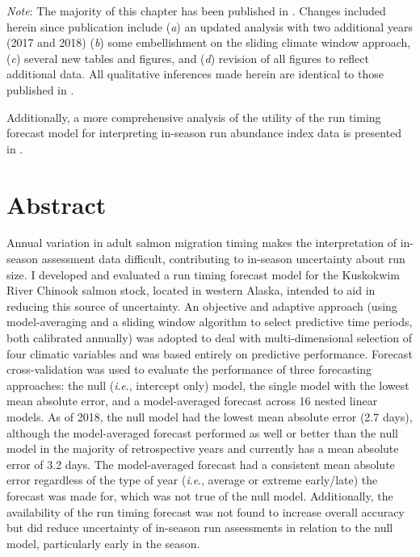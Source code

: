 \documentclass[12pt,]{book}
\theoremstyle{definition}
\theoremstyle{definition}
\theoremstyle{definition}
\theoremstyle{remark}
\begin{document}
\singlespacing
\noindent
\footnotesize
\textit{Note}: The majority of this chapter has been published in
\cite{staton-etal-2017-rtf}. Changes included herein since publication
include (\textit{a}) an updated analysis with two additional years (2017
and 2018) (\textit{b}) some embellishment on the sliding climate window
approach, (\textit{c}) several new tables and figures, and (\textit{d})
revision of all figures to reflect additional data. All qualitative
inferences made herein are identical to those published in
\cite{staton-etal-2017-rtf}.

\vspace{0.25cm}

\noindent
Additionally, a more comprehensive analysis of the utility of the run
timing forecast model for interpreting in-season run abundance index
data is presented in \citet{staton-catalano-2019}. \singlespacing

\normalsize
\doublespacing

\section*{Abstract}\label{abstract}

\noindent
Annual variation in adult salmon migration timing makes the
interpretation of in-season assessment data difficult, contributing to
in-season uncertainty about run size. I developed and evaluated a run
timing forecast model for the Kuskokwim River Chinook salmon stock,
located in western Alaska, intended to aid in reducing this source of
uncertainty. An objective and adaptive approach (using model-averaging
and a sliding window algorithm to select predictive time periods, both
calibrated annually) was adopted to deal with multi-dimensional
selection of four climatic variables and was based entirely on
predictive performance. Forecast cross-validation was used to evaluate
the performance of three forecasting approaches: the null
(\emph{i}.\emph{e}., intercept only) model, the single model with the
lowest mean absolute error, and a model-averaged forecast across 16
nested linear models. As of 2018, the null model had the lowest mean
absolute error (2.7 days), although the model-averaged forecast
performed as well or better than the null model in the majority of
retrospective years and currently has a mean absolute error of 3.2 days.
The model-averaged forecast had a consistent mean absolute error
regardless of the type of year (\emph{i}.\emph{e}., average or extreme
early/late) the forecast was made for, which was not true of the null
model. Additionally, the availability of the run timing forecast was not
found to increase overall accuracy but did reduce uncertainty of
in-season run assessments in relation to the null model, particularly
early in the season.
\end{document}
